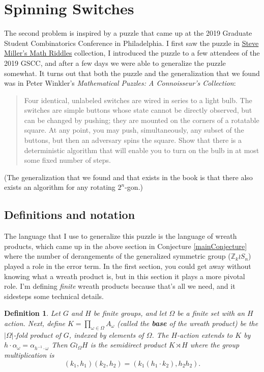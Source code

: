 \documentclass{article}
\numberwithin{equation}{subsection}
\newtheorem{definition}[theo]{Definition}
\begin{document}
\section{Spinning Switches}
The second problem is inspired by a puzzle that came up at the
2019 Graduate Student Combinatorics Conference in Philadelphia.
I first saw the puzzle in
\href{https://mathriddles.williams.edu/?p=77}{Steve Miller's Math Riddles}
collection, I introduced the puzzle to a few attendees of the 2019 GSCC, and
after a few days we were able to generalize the puzzle somewhat.
It turns out that both the puzzle and the generalization that we found was
in Peter Winkler's \textit{Mathematical Puzzles: A Connoisseur's Collection}:
\begin{quote}
  Four identical, unlabeled switches are wired in series to a light bulb.
  The switches are simple buttons whose state cannot be directly observed,
  but can be changed by pushing; they are mounted on the corners of a rotatable
  square. At any point, you may push, simultaneously, any subset of the buttons,
  but then an adversary spins the square. Show that there is a deterministic
  algorithm that will enable you to turn on the bulb in at most some fixed
  number of steps.
\end{quote}
(The generalization that we found and that exists in the book is that there
also exists an algorithm for any rotating $2^n$-gon.)

\subsection{Definitions and notation}
The language that I use to generalize this puzzle is the language of wreath
products, which came up in the above section in Conjecture \ref{mainConjecture}
where the number of derangements of the generalized symmetric group
($\mathbb Z_k \wr S_n$) played a role in the error term. In the first section,
you could get away without knowing what a wreath product is, but in this section
it plays a more pivotal role. I'm defining \textit{finite} wreath products
because that's all we need, and it sidesteps some technical details.
\begin{definition}
  Let $G$ and $H$ be finite groups, and let $\Omega$ be a finite set with an $H$ action.
  Next, define $K = \prod_{\omega \in \Omega} A_\omega$ (called the \textbf{base} of the wreath product) be the
  $|\Omega|$-fold product of $G$, indexed by elements of $\Omega$.
  The $H$-action extends to $K$ by $h \cdot \alpha_\omega = \alpha_{h^{-1} \cdot \omega}$
  Then $G \wr_\Omega H$ is the semidirect product $K \rtimes H$ where
  the group multiplication is \begin{equation}
    (k_1, h_1) (k_2, h_2) = (k_1 (h_1 \cdot k_2) ,h_2 h_2).
  \end{equation}
\end{definition}
\end{document}
